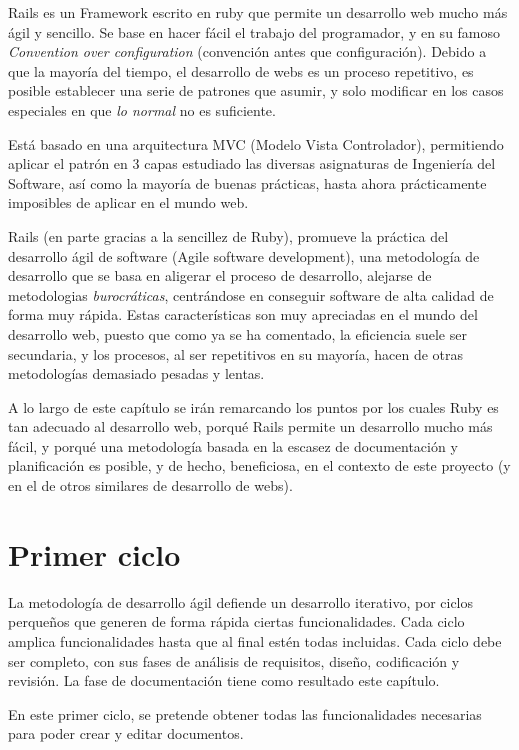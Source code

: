 Rails es un Framework escrito en ruby que permite un desarrollo web mucho más ágil y sencillo. Se base en hacer fácil el trabajo del programador, y en su famoso \emph{Convention over configuration} (convención antes que configuración). Debido a que la mayoría del tiempo, el desarrollo de webs es un proceso repetitivo, es posible establecer una serie de patrones que asumir, y solo modificar en los casos especiales en que \emph{lo normal} no es suficiente.

Está basado en una arquitectura MVC (Modelo Vista Controlador), permitiendo aplicar el patrón en 3 capas estudiado las diversas asignaturas de Ingeniería del Software, así como la mayoría de buenas prácticas, hasta ahora prácticamente imposibles de aplicar en el mundo web.

Rails (en parte gracias a la sencillez de Ruby), promueve la práctica del desarrollo ágil de software (Agile software development), una metodología de desarrollo que se basa en aligerar el proceso de desarrollo, alejarse de metodologias \emph{burocráticas}, centrándose en conseguir software de alta calidad de forma muy rápida. Estas características son muy apreciadas en el mundo del desarrollo web, puesto que como ya se ha comentado, la eficiencia suele ser secundaria, y los procesos, al ser repetitivos en su mayoría, hacen de otras metodologías demasiado pesadas y lentas.

A lo largo de este capítulo se irán remarcando los puntos por los cuales Ruby es tan adecuado al desarrollo web, porqué Rails permite un desarrollo mucho más fácil, y porqué una metodología basada en la escasez de documentación y planificación es posible, y de hecho, beneficiosa, en el contexto de este proyecto (y en el de otros similares de desarrollo de webs). 


\section{Primer ciclo} %
\label{sec:primer_ciclo}
La metodología de desarrollo ágil defiende un desarrollo iterativo, por ciclos perqueños que generen de forma rápida ciertas funcionalidades. Cada ciclo amplica funcionalidades hasta que al final estén todas incluidas. Cada ciclo debe ser completo, con sus fases de análisis de requisitos, diseño, codificación y revisión. La fase de documentación tiene como resultado este capítulo.

En este primer ciclo, se pretende obtener todas las funcionalidades necesarias para poder crear y editar documentos.

